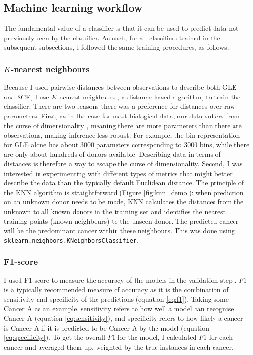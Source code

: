 \subsection{Machine learning workflow}
The fundamental value of a classifier is that it can be used to predict data not previously seen by the classifier. As such, for all classifiers trained in the subsequent subsections, I followed the same training procedures, as follows. 

\subsubsection{$K$-nearest neighbours}
Because I used pairwise distances between observations to describe both GLE and SCE, I use $K$-nearest neighbours \citep[KNN;][]{Neath2010DiscriminationClassification}, a distance-based algorithm, to train the classifier. There are two reasons there was a preference for distances over raw parameters. First, as in the case for most biological data, our data suffers from the curse of dimensionality \citep{Banks2003DataStatistics}, meaning there are more parameters than there are observations, making inference less robust. For example, the bin representation for GLE alone has about 3000 parameters corresponding to 3000 bins, while there are only about hundreds of donors available. Describing data in terms of distances is therefore a way to escape the curse of dimensionality. Second, I was interested in experimenting with different types of metrics that might better describe the data than the typically default Euclidean distance. The principle of the KNN algorithm is straightforward (Figure \ref{fig:knn_demo}): when prediction on an unknown donor needs to be made, KNN calculates the distances from the unknown to all known donors in the training set and identifies the nearest training points (known neighbours) to the unseen donor. The predicted cancer will be the predominant cancer within these neighbours. This was done using \texttt{sklearn.neighbors.KNeighborsClassifier}.



\newpage
\subsubsection{F1-score}
I used F1-score to measure the accuracy of the models in the validation step \citep{Kulkarni2020FoundationsDemocracy}. $F1$ is a typically recommended measure of accuracy as it is the combination of sensitivity and specificity of the predictions (equation \ref{eq:f1}). Taking some Cancer A as an example, sensitivity refers to how well a model can recognise Cancer A (equation \ref{eq:sensitivity}), and specificity refers to how likely a cancer is Cancer A if it is predicted to be Cancer A by the model (equation \ref{eq:specificity}). To get the overall $F1$ for the model, I calculated $F1$ for each cancer and averaged them up, weighted by the true instances in each cancer.

